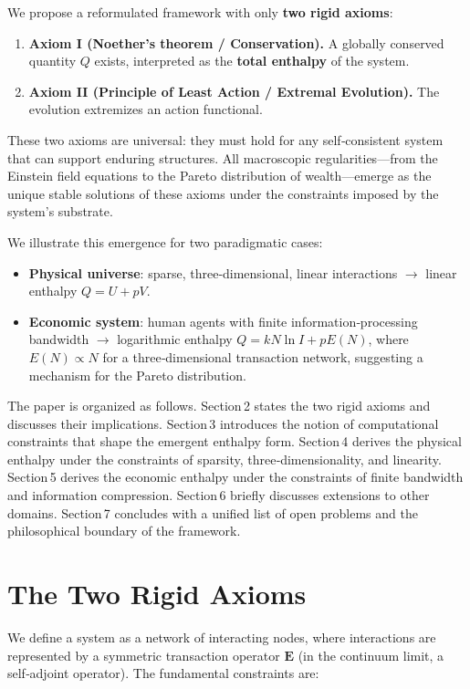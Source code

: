 \documentclass{article}
\begin{document}
We propose a reformulated framework with only \textbf{two rigid axioms}:
\begin{enumerate}
    \item \textbf{Axiom I (Noether’s theorem / Conservation).} A globally conserved quantity $Q$ exists, interpreted as the \textbf{total enthalpy} of the system.
    \item \textbf{Axiom II (Principle of Least Action / Extremal Evolution).} The evolution extremizes an action functional.
\end{enumerate}
These two axioms are universal: they must hold for any self‑consistent system that can support enduring structures. All macroscopic regularities—from the Einstein field equations to the Pareto distribution of wealth—emerge as the unique stable solutions of these axioms under the constraints imposed by the system’s substrate.

We illustrate this emergence for two paradigmatic cases:
\begin{itemize}
    \item \textbf{Physical universe}: sparse, three‑dimensional, linear interactions $\to$ linear enthalpy $Q = U + pV$.
    \item \textbf{Economic system}: human agents with finite information‑processing bandwidth $\to$ logarithmic enthalpy $Q = k N \ln I + p E(N)$, where $E(N) \propto N$ for a three‑dimensional transaction network, suggesting a mechanism for the Pareto distribution.
\end{itemize}

The paper is organized as follows. Section 2 states the two rigid axioms and discusses their implications. Section 3 introduces the notion of computational constraints that shape the emergent enthalpy form. Section 4 derives the physical enthalpy under the constraints of sparsity, three‑dimensionality, and linearity. Section 5 derives the economic enthalpy under the constraints of finite bandwidth and information compression. Section 6 briefly discusses extensions to other domains. Section 7 concludes with a unified list of open problems and the philosophical boundary of the framework.

\section{The Two Rigid Axioms}
We define a system as a network of interacting nodes, where interactions are represented by a symmetric transaction operator $\mathbf{E}$ (in the continuum limit, a self‑adjoint operator). The fundamental constraints are:
\end{document}
